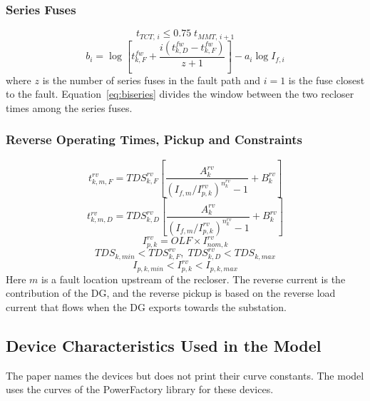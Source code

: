 \documentclass[12pt,letterpaper]{article}
\newcommand{\PF}{PowerFactory}
\begin{document}
\subsubsection{Series Fuses}
\begin{equation}
t_{TCT,\,i} \le 0.75\; t_{MMT,\,i+1}
\label{eq:75}
\end{equation}
\begin{equation}
b_i = \log\!\left[t^{fw}_{k,F}+\frac{i\left(t^{fw}_{k,D}-t^{fw}_{k,F}\right)}{z+1}\right] - a_i \log I_{f,i}
\label{eq:biseries}
\end{equation}
where $z$ is the number of series fuses in the fault path and $i=1$ is the fuse closest to the fault.
Equation~\eqref{eq:biseries} divides the window between the two recloser times among the series fuses.

\subsubsection{Reverse Operating Times, Pickup and Constraints}
\begin{equation}
t^{rv}_{k,m,F} = TDS^{rv}_{k,F}\left[\frac{A^{rv}_{k}}{\left(I_{f,m}/I^{rv}_{p,k}\right)^{n^{rv}_{k}}-1}+B^{rv}_{k}\right]
\label{eq:trf}
\end{equation}
\begin{equation}
t^{rv}_{k,m,D} = TDS^{rv}_{k,D}\left[\frac{A^{rv}_{k}}{\left(I_{f,m}/I^{rv}_{p,k}\right)^{n^{rv}_{k}}-1}+B^{rv}_{k}\right]
\label{eq:trd}
\end{equation}
\begin{equation}
I^{rv}_{p,k} = OLF \times I^{rv}_{nom,k}
\label{eq:iprv}
\end{equation}
\begin{equation}
TDS_{k,min} < TDS^{rv}_{k,F},\; TDS^{rv}_{k,D} < TDS_{k,max}
\end{equation}
\begin{equation}
I_{p,k,min} < I^{rv}_{p,k} < I_{p,k,max}
\end{equation}
Here $m$ is a fault location upstream of the recloser. The reverse current is the contribution of the DG, and
the reverse pickup is based on the reverse load current that flows when the DG exports towards the
substation.

\subsection{Device Characteristics Used in the Model}
\label{sec:curves}
The paper names the devices but does not print their curve constants. The model uses the curves of the \PF{}
library for these devices.
\end{document}
